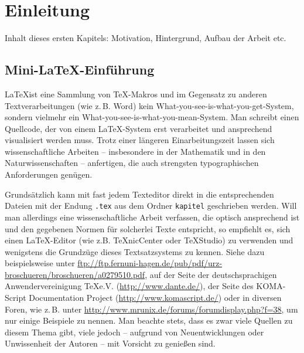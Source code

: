 \chapter{Einleitung}
Inhalt dieses ersten Kapitels: Motivation, Hintergrund, Aufbau der Arbeit etc.

\section{Mini-\LaTeX-Einführung}

\LaTeX ist eine Sammlung von \TeX-Makros und im Gegensatz zu anderen Textverarbeitungen (wie z.\,B. Word) kein What-you-see-is-what-you-get-System, sondern vielmehr ein What-you-see-is-what-you-mean-System. Man schreibt einen Quellcode, der von einem \LaTeX-System erst verarbeitet und ansprechend visualisiert werden muss. Trotz einer längeren Einarbeitungszeit lassen sich wissenschaftliche Arbeiten -- insbesondere in der Mathematik und in den Naturwissenschaften -- anfertigen, die auch strengsten typographischen Anforderungen genügen.

Grundsätzlich kann mit fast jedem Texteditor direkt in die entsprechenden Dateien mit der Endung \texttt{.tex} aus dem Ordner \texttt{kapitel} geschrieben werden. Will man allerdings eine wissenschaftliche Arbeit verfassen, die optisch ansprechend ist und den gegebenen Normen für solcherlei Texte entspricht, so empfiehlt es, sich einen \LaTeX-Editor (wie z.B. TeXnicCenter oder TeXStudio) zu verwenden und wenigstens die Grundzüge dieses Textsatzsystems zu kennen. Siehe dazu beispielsweise unter \url{ftp://ftp.fernuni-hagen.de/pub/pdf/urz-broschueren/broschueren/a0279510.pdf}, auf der Seite der deutschsprachigen Anwendervereinigung \TeX e.V. (\url{http://www.dante.de/}), der Seite des KOMA-Script Documentation Project (\url{http://www.komascript.de/}) oder in diversen Foren, wie z.\,B. unter \url{http://www.mrunix.de/forums/forumdisplay.php?f=38}, um nur einige Beispiele zu nennen. Man beachte stets, dass es zwar viele Quellen zu diesem Thema gibt, viele jedoch -- aufgrund von Neuentwicklungen oder Unwissenheit der Autoren -- mit Vorsicht zu genießen sind.

